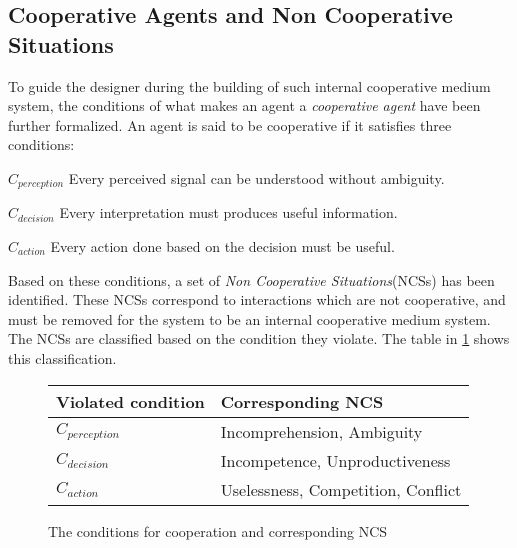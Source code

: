 \subsection{Cooperative Agents and Non Cooperative Situations}

To guide the designer during the building of such internal cooperative medium system, the conditions of what makes an agent a \emph{cooperative agent} have been further formalized. An agent is said to be cooperative if it satisfies three conditions:
\begin{compactitem}
\item $C_{perception}$ Every perceived signal can be understood without ambiguity.
\item $C_{decision}$ Every interpretation must produces useful information.
\item $C_{action}$ Every action done based on the decision must be useful.
\end{compactitem}

Based on these conditions, a set of \emph{Non Cooperative Situations}(NCSs) has been identified. These NCSs correspond to interactions which are not cooperative, and must be removed for the system to be an internal cooperative medium system. The NCSs are classified based on the condition they violate. The table in \figurename{} \ref{NCS} shows this classification.

\begin{figure}
\centering
\begin{tabular}{ll}
\toprule
\textbf{Violated condition}	& \textbf{Corresponding NCS} \\
\midrule
$C_{perception}$ & Incomprehension, Ambiguity\\

$C_{decision}$ & Incompetence, Unproductiveness \\

$C_{action}$ & Uselessness, Competition, Conflict\\
\bottomrule
\end{tabular}
\caption{The conditions for cooperation and corresponding NCS}
\label{NCS}
\end{figure}

